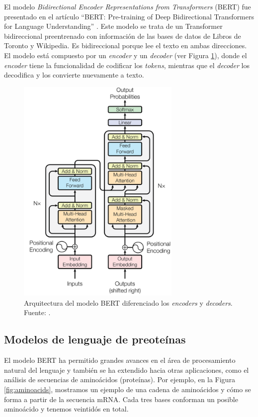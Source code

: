 El modelo \textit{Bidirectional Encoder Representations from Transformers} (BERT) fue presentado en el artículo ``BERT: Pre-training of Deep Bidirectional Transformers for Language Understanding'' \cite{devlin2018bert}. Este modelo se trata de un Transformer bidireccional preentrenado con información de las bases de datos de Libros de Toronto y Wikipedia. Es bidireccional porque lee el texto en ambas direcciones. El modelo está compuesto por un \textit{encoder} y un \textit{decoder} (ver Figura \ref{fig:bert_paper}), donde el \textit{encoder} tiene la funcionalidad de codificar los \textit{tokens}, mientras que el \textit{decoder} los decodifica y los convierte nuevamente a texto.

\begin{figure}[H]
	\centering\includegraphics[width=0.7\textwidth]{../img/proposal/bert}
	\caption[Aquitectura del modelo BERT]{Arquitectura del modelo BERT diferenciado los \textit{encoders} y \textit{decoders}. Fuente: \cite{devlin2018bert}.}
	\label{fig:bert_paper}
\end{figure}


\subsection{Modelos de lenguaje de preoteínas}

El modelo BERT ha permitido grandes avances en el área de procesamiento natural del lenguaje y también se ha extendido hacia otras aplicaciones, como el análisis de secuencias de aminoácidos (proteínas). Por ejemplo, en la Figura \ref{fig:aminoacids}, mostramos un ejemplo de una cadena de aminoácidos y cómo se forma a partir de la secuencia mRNA. Cada tres bases conforman un posible aminoácido y tenemos veintidós en total.


